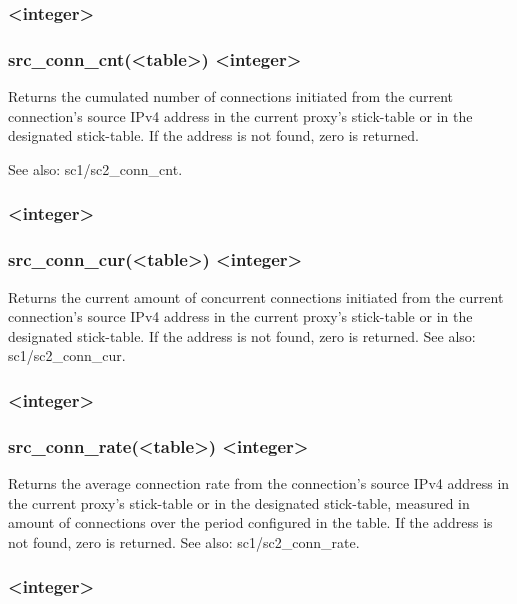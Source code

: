 \subsubsection[src\_conn\_cnt]{ <integer>}
\subsubsection*{src\_conn\_cnt(<table>) <integer>}
  Returns the cumulated number of connections initiated from the current
  connection's source IPv4 address in the current proxy's stick-table or in
  the designated stick-table. If the address is not found, zero is returned.

See also: sc1/sc2\_conn\_cnt.

\subsubsection[src\_conn\_cur]{ <integer>}
\subsubsection*{src\_conn\_cur(<table>) <integer>}


  Returns the current amount of concurrent connections initiated from the
  current connection's source IPv4 address in the current proxy's stick-table
  or in the designated stick-table. If the address is not found, zero is
  returned.
See also: sc1/sc2\_conn\_cur.

\subsubsection[src\_conn\_rate]{ <integer>}
\subsubsection*{src\_conn\_rate(<table>) <integer>}
  Returns the average connection rate from the connection's source IPv4 address
  in the current proxy's stick-table or in the designated stick-table, measured
  in amount of connections over the period configured in the table. If the
  address is not found, zero is returned.
See also: sc1/sc2\_conn\_rate.

\subsubsection[src\_get\_gpc0]{ <integer>}
